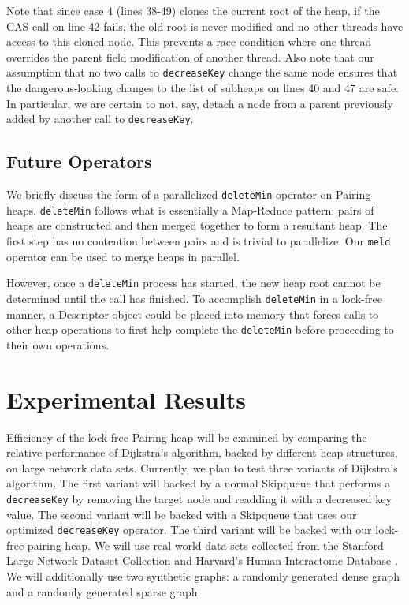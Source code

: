 \documentclass{acm_proc_article-sp}
\begin{document}
Note that since case 4 (lines 38-49) clones the current root of the heap, if the CAS
call on line 42 fails, the old root is never modified and no other threads
have access to this cloned node. This prevents a race condition where one
thread overrides the parent field modification of another thread. Also
note that our assumption that no two calls to \texttt{decreaseKey} change
the same node ensures that the dangerous-looking changes to the
list of subheaps on lines 40 and 47 are safe. In particular, we are
certain to not, say, detach a node from a parent previously added by
another call to \texttt{decreaseKey}.



\subsection{Future Operators}
We briefly discuss the form of a parallelized \texttt{deleteMin} operator on Pairing heaps.
\texttt{deleteMin} follows what is essentially a Map-Reduce pattern: pairs of heaps are constructed
and then merged together to form a resultant heap. The first step has no contention between pairs
and is trivial to parallelize. Our \texttt{meld} operator can be used to merge heaps in parallel.

However, once a \texttt{deleteMin} process has started, the new heap root cannot be determined until
the call has finished.
To accomplish \texttt{deleteMin} in a lock-free manner, a Descriptor object could be placed into memory
that forces calls to other heap operations to first help complete the \texttt{deleteMin} before proceeding
to their own operations.

\section{Experimental Results}
Efficiency of the lock-free Pairing heap will be examined by comparing the relative performance of Dijkstra's algorithm, backed by different heap structures, on large network data sets. Currently, we
plan to test three variants of Dijkstra's algorithm. The first variant will backed by a normal Skipqueue that performs a \texttt{decreaseKey} by removing the target node and readding it with a decreased key value.
The second variant will be backed with a Skipqueue that uses our optimized \texttt{decreaseKey} operator. The third variant will be backed with our lock-free pairing heap. We
will use real world data sets collected from the Stanford Large Network Dataset Collection \cite{slndc} and Harvard's Human Interactome Database \cite{hid}. We will additionally use two
synthetic graphs: a randomly generated dense graph and a randomly generated sparse graph.
\end{document}
